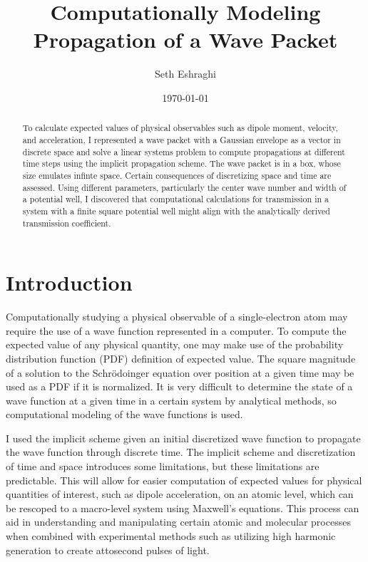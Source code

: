 \documentclass[letterpaper,12pt]{article}
\title{Computationally Modeling Propagation of a Wave Packet}
\author{Seth Eshraghi}
\date{\today}
\begin{document}
    \maketitle
    \thispagestyle{empty}

    \begin{abstract}
        To calculate expected values of physical observables such as dipole
        moment, velocity, and acceleration, I represented a wave packet with a
        Gaussian envelope as a vector in discrete space and solve a linear
        systems problem to compute propagations at different time steps using
        the implicit propagation scheme. The wave packet is in a box, whose size
        emulates infinte space. Certain consequences of discretizing space and
        time are assessed. Using different parameters, particularly the center
        wave number and width of a potential well, I discovered that
        computational calculations for transmission in a system with a finite
        square potential well might align with the analytically derived
        transmission coefficient.
    \end{abstract}

    \newpage

    \tableofcontents
    \listoffigures

    \newpage

    \section*{Introduction}

    Computationally studying a physical observable of a single-electron atom may
    require the use of a wave function represented in a
    computer.
    To compute the expected value of any physical quantity, one may make use of
    the probability distribution function (PDF) definition of expected value.
    The square magnitude of a solution to the Schrödoinger equation over
    position at a given time may be used as a PDF if it is normalized. It is
    very difficult to
    determine the state of a wave function at a given time in a certain system
    by analytical methods, so computational modeling of the wave functions is
    used.

    I used the implicit scheme given an initial discretized wave function
    to propagate the wave function through discrete time. The implicit scheme
    and discretization of time and space introduces some limitations, but these
    limitations are predictable. This will allow for easier computation of
    expected values for physical quantities of interest, such as dipole
    acceleration, on an atomic level, which can be rescoped to a macro-level
    system using Maxwell's equations. This process can aid in understanding and
    manipulating certain atomic and molecular processes when combined with
    experimental methods such as utilizing high harmonic generation to create
    attosecond pulses of light.
\end{document}
